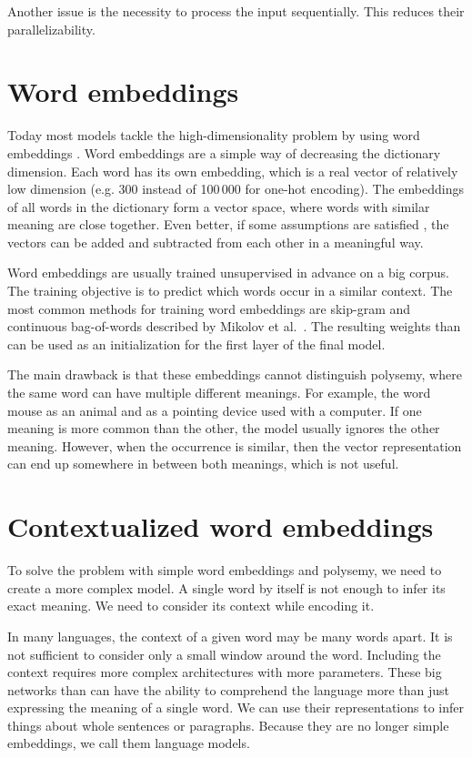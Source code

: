 \documentclass[
  printed, %
  color,   %
  table,   %
  oneside, %
  lof,     %
  lot,     %
]{fithesis3}
\begin{document}
Another issue is the necessity to process the input sequentially. This reduces their parallelizability. 

\section{Word embeddings}
Today most models tackle the high-dimensionality problem by using word embeddings \parencite{mikolov}. Word embeddings are a simple way of decreasing the dictionary dimension. Each word has its own embedding, which is a real vector of relatively low dimension (e.g. 300 instead of 100\,000 for one-hot encoding). The embeddings of all words in the dictionary form a vector space, where words with similar meaning are close together. Even better, if some assumptions are satisfied \parencite{vectadd}, the vectors can be added and subtracted from each other in a meaningful way.  

Word embeddings are usually trained unsupervised in advance on a big corpus. The training objective is to predict which words occur in a similar context. The most common methods for training word embeddings are skip-gram and continuous bag-of-words described by Mikolov et al.~\parencite{mikolov}. The resulting weights than can be used as an initialization for the first layer of the final model.

The main drawback is that these embeddings cannot distinguish polysemy, where the same word can have multiple different meanings. For example, the word mouse as an animal and as a pointing device used with a computer. If one meaning is more common than the other, the model usually ignores the other meaning. However, when the occurrence is similar, then the vector representation can end up somewhere in between both meanings, which is not useful.

\section{Contextualized word embeddings}
To solve the problem with simple word embeddings and polysemy, we need to create a more complex model. A single word by itself is not enough to infer its exact meaning. We need to consider its context while encoding it. 

In many languages, the context of a given word may be many words apart. It is not sufficient to consider only a small window around the word. Including the context requires more complex architectures with more parameters. These big networks than can have the ability to comprehend the language more than just expressing the meaning of a single word. We can use their representations to infer things about whole sentences or paragraphs. Because they are no longer simple embeddings, we call them language models.
\end{document}
